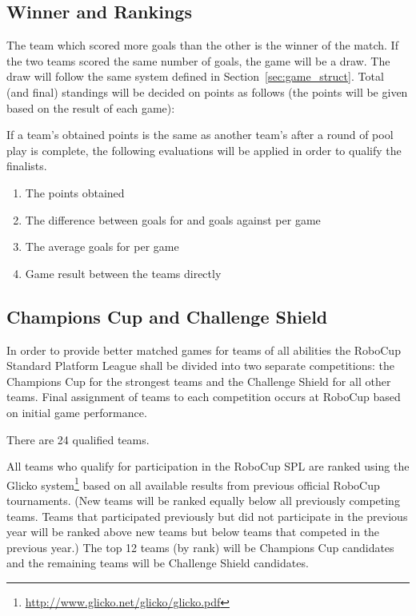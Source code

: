 \subsection{Winner and Rankings}
\label{sec:rankings}

The team which scored more goals than the other is the winner of the match. If the two teams scored the same number of goals, the game will be a draw. The draw will follow the same system defined in Section~\ref{sec:game_struct}. Total (and final) standings will be decided on points as follows (the points will be given based on the result of each game):


If a team's obtained points is the same as another team's after a round of pool play is complete, the following evaluations will be applied in order to qualify the finalists.

\begin{enumerate}

\item The points obtained

\item The difference between goals for and goals against per game

\item The average goals for per game

\item Game result between the teams directly

\end{enumerate}

\subsection{Champions Cup and Challenge Shield}
\label{sec:twoCompetitions}
In order to provide better matched games for teams of all abilities the RoboCup Standard Platform League shall be divided into two separate competitions: the Champions Cup for the strongest teams and the Challenge Shield for all other teams. Final assignment of teams to each competition occurs at RoboCup based on initial game performance.

There are 24 qualified teams.

All teams who qualify for participation in the RoboCup SPL are ranked using the Glicko system\footnote{\url{http://www.glicko.net/glicko/glicko.pdf}} based on all available results from previous official RoboCup tournaments. (New teams will be ranked equally below all previously competing teams. Teams that participated previously but did not participate in the previous year will be ranked above new teams but below teams that competed in the previous year.) The top 12 teams (by rank) will be Champions Cup candidates and the remaining teams will be Challenge Shield candidates.

